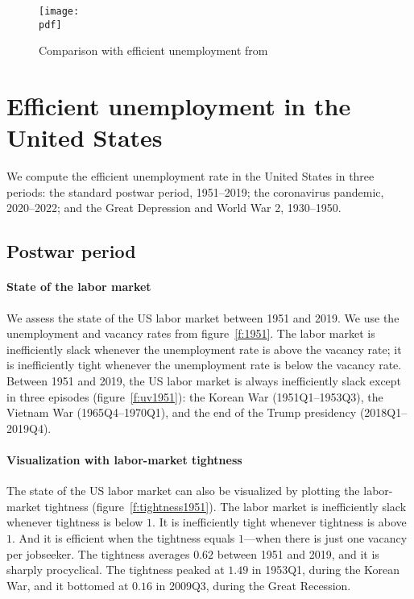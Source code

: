 \documentclass[letterpaper,12pt,leqno]{article}
\newcommand{\pdf}{../../figures/xsquareroot_202206.pdf}
\begin{document}
\begin{figure}[t]
\texttt{[image: \\pdf]}
\caption{Comparison with efficient unemployment from \citet{MS16}}
\label{f:comparison}\end{figure}


\section{Efficient unemployment in the United States}\label{s:postwar}

We compute the efficient unemployment rate in the United States in three periods: the standard postwar period, 1951--2019; the coronavirus pandemic, 2020--2022; and the Great Depression and World War 2, 1930--1950.

\subsection{Postwar period}

\paragraph{State of the labor market} We assess the state of the US labor market between 1951 and 2019. We use the unemployment and vacancy rates from figure~\ref{f:1951}. The labor market is inefficiently slack whenever the unemployment rate is above the vacancy rate; it is inefficiently tight whenever the unemployment rate is below the vacancy rate. Between 1951 and 2019, the US labor market is always inefficiently slack except in three episodes (figure~\ref{f:uv1951}): the Korean War (1951Q1--1953Q3), the Vietnam War (1965Q4--1970Q1), and the end of the Trump presidency (2018Q1--2019Q4).

\paragraph{Visualization with labor-market tightness} The state of the US labor market can also be visualized by plotting the labor-market tightness (figure~\ref{f:tightness1951}). The labor market is inefficiently slack whenever tightness is below $1$. It is inefficiently tight whenever tightness is above $1$. And it is efficient when the tightness equals $1$---when there is just one vacancy per jobseeker. The tightness averages $0.62$ between 1951 and 2019, and it is sharply procyclical. The tightness peaked at $1.49$ in 1953Q1, during the Korean War, and it bottomed at $0.16$ in 2009Q3, during the Great Recession.
\end{document}

